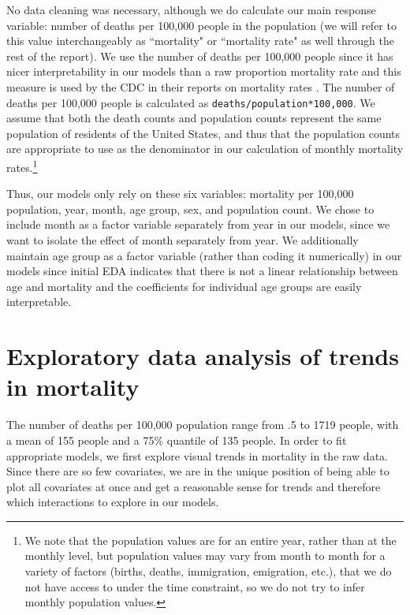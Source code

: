 \documentclass[letterpaper, 11pt]{article}
\begin{document}
No data cleaning was necessary, although we do calculate our main response variable: number of deaths per 100,000 people in the population (we will refer to this value interchangeably as ``mortality" or ``mortality rate" as well through the rest of the report). We use the number of deaths per 100,000 people since it has nicer interpretability in our models than a raw proportion mortality rate and this measure is used by the CDC in their reports on mortality rates \cite{cdc_2018}. The number of deaths per 100,000 people is calculated as \texttt{deaths/population*100,000}. We assume that both the death counts and population counts represent the same population of residents of the United States, and thus that the population counts are appropriate to use as the denominator in our calculation of monthly mortality rates.\footnote{We note that the population values are for an entire year, rather than at the monthly level, but population values may vary from month to month for a variety of factors (births, deaths, immigration, emigration, etc.), that we do not have access to under the time constraint, so we do not try to infer monthly population values.}

Thus, our models only rely on these six variables: mortality per 100,000 population, year, month, age group, sex, and population count. We chose to include month as a factor variable separately from year in our models, since we want to isolate the effect of month separately from year. We additionally maintain age group as a factor variable (rather than coding it numerically) in our models since initial EDA indicates that there is not a linear relationship between age and mortality and the coefficients for individual age groups are easily interpretable.

\section{Exploratory data analysis of trends in mortality}\label{eda}

The number of deaths per 100,000 population range from .5 to 1719 people, with a mean of 155 people and a 75\% quantile of 135 people. In order to fit appropriate models, we first explore visual trends in mortality in the raw data. Since there are so few covariates, we are in the unique position of being able to plot all covariates at once and get a reasonable sense for trends and therefore which interactions to explore in our models.
\end{document}
